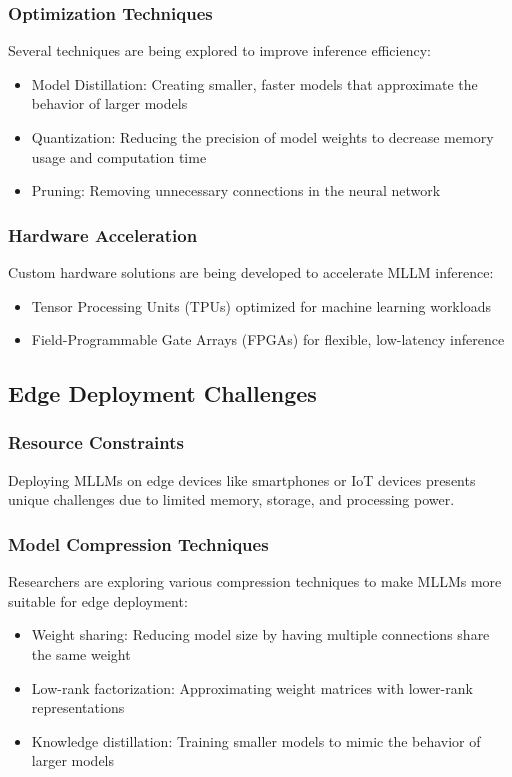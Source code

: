 \subsubsection{Optimization Techniques}
Several techniques are being explored to improve inference efficiency:
\begin{itemize}
    \item Model Distillation: Creating smaller, faster models that approximate the behavior of larger models
    \item Quantization: Reducing the precision of model weights to decrease memory usage and computation time
    \item Pruning: Removing unnecessary connections in the neural network
\end{itemize}

\subsubsection{Hardware Acceleration}
Custom hardware solutions are being developed to accelerate MLLM inference:
\begin{itemize}
    \item Tensor Processing Units (TPUs) optimized for machine learning workloads
    \item Field-Programmable Gate Arrays (FPGAs) for flexible, low-latency inference
\end{itemize}

\subsection{Edge Deployment Challenges}
\subsubsection{Resource Constraints}
Deploying MLLMs on edge devices like smartphones or IoT devices presents unique challenges due to limited memory, storage, and processing power.

\subsubsection{Model Compression Techniques}
Researchers are exploring various compression techniques to make MLLMs more suitable for edge deployment:
\begin{itemize}
    \item Weight sharing: Reducing model size by having multiple connections share the same weight
    \item Low-rank factorization: Approximating weight matrices with lower-rank representations
    \item Knowledge distillation: Training smaller models to mimic the behavior of larger models
\end{itemize}

